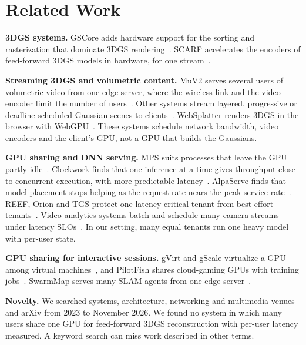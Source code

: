 \section{Related Work}
\label{sec:related}

\textbf{3DGS systems.}
GSCore adds hardware support for the sorting and rasterization that dominate 3DGS rendering~\cite{gscore2024}.
SCARF accelerates the encoders of feed-forward 3DGS models in hardware, for one stream~\cite{scarf2026}.

\textbf{Streaming 3DGS and volumetric content.}
MuV2 serves several users of volumetric video from one edge server, where the wireless link and the video encoder limit the number of users~\cite{muv2_2024}.
Other systems stream layered, progressive or deadline-scheduled Gaussian scenes to clients~\cite{l3gs2025,lts2025,lmg2026,moqsplat2026,partialgs2026,gaussanything2026,siekkinen2026}.
WebSplatter renders 3DGS in the browser with WebGPU~\cite{websplatter2026}.
These systems schedule network bandwidth, video encoders and the client's GPU, not a GPU that builds the Gaussians.

\textbf{GPU sharing and DNN serving.}
MPS suits processes that leave the GPU partly idle~\cite{nvidia_mps,gilman2021}.
Clockwork finds that one inference at a time gives throughput close to concurrent execution, with more predictable latency~\cite{clockwork2020}.
AlpaServe finds that model placement stops helping as the request rate nears the peak service rate~\cite{alpaserve2023}.
REEF, Orion and TGS protect one latency-critical tenant from best-effort tenants~\cite{reef2022,orion2024,tgs2023}.
Video analytics systems batch and schedule many camera streams under latency SLOs~\cite{nexus2019,videostorm2017}.
In our setting, many equal tenants run one heavy model with per-user state.

\textbf{GPU sharing for interactive sessions.}
gVirt and gScale virtualize a GPU among virtual machines~\cite{gvirt2014,gscale2016}, and PilotFish shares cloud-gaming GPUs with training jobs~\cite{pilotfish2022}.
SwarmMap serves many SLAM agents from one edge server~\cite{swarmmap2022}.

\textbf{Novelty.}
We searched systems, architecture, networking and multimedia venues and arXiv from 2023 to November 2026.
We found no system in which many users share one GPU for feed-forward 3DGS reconstruction with per-user latency measured.
A keyword search can miss work described in other terms.
